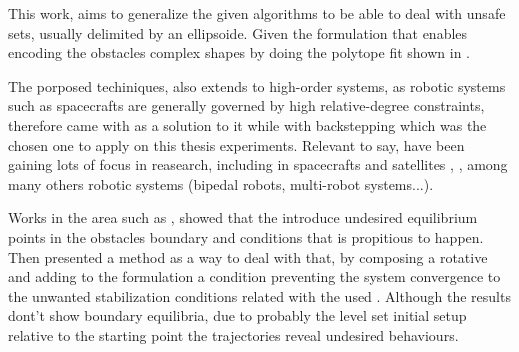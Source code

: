 
This work, aims to generalize the given algorithms to be able to deal with unsafe sets, usually delimited by an ellipsoide. Given the  formulation that enables encoding the obstacles complex shapes by doing the polytope fit shown in \cite{molnar2023composing}.   

The porposed techiniques, also extends to high-order systems, as robotic systems such as spacecrafts are generally governed by high relative-degree constraints, therefore \cite{ames2019control} came with  as a solution to it while \cite{taylor2022safe} with backstepping which was the chosen one to apply on this thesis experiments.
Relevant to say,  have been gaining lots of focus in reasearch, including in spacecrafts and satellites \cite{breeden2022predictive, breeden2021guaranteed},  \cite{singletary2021comparative}, among many others robotic systems \cite{ames2019control} (bipedal robots, multi-robot systems...). 

Works in the area such as \cite{reis2020control}, showed that the  \cite{ames2019control} introduce undesired equilibrium points in the obstacles boundary and conditions that is propitious to happen. Then \cite{reis2020control} presented a method as a way to deal with that, by composing a rotative  and adding to the  formulation a  condition preventing the system convergence to the unwanted stabilization conditions related with the used . Although the results dont't show boundary equilibria, due to probably the  level set initial setup relative to the starting point the trajectories reveal undesired behaviours.


